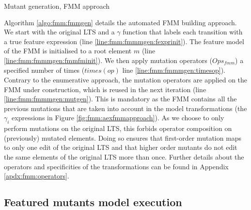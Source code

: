 \begin{algorithm}
	\caption{Mutant generation, FMM approach}
 \label{algo:fmm:fmmgen}
\end{algorithm}

Algorithm \ref{algo:fmm:fmmgen} details the automated FMM building approach. We start with the original LTS and a $\gamma$ function that labels each transition with a true feature expression (line \ref{line:fmm:fmmmgen:fexprinit}). The feature model of the FMM is initialised to a root element $m$ (line \ref{line:fmm:fmmmgen:fmmfminit}). We then apply mutation operators ($\mathit{Ops_{fmm}}$) a specified number of times ($\mathit{times}(\mathit{op})$ line \ref{line:fmm:fmmmgen:timesop}). Contrary to the enumerative approach, the mutation operators are applied on the FMM under construction, which is reused in the next iteration (line \ref{line:fmm:fmmmgen:mutgen}). This is mandatory as the FMM contains all the previous mutations that are taken into account in the model transformations (\eg the $\gamma_{i}$ expressions in Figure \ref{fig:fmm:aexfmmapproach}). 
As we choose to only perform mutations on the original LTS, this forbids operator composition on (previously) mutated elements. Doing so ensures that first-order mutation maps to only one edit of the original LTS and that higher order mutants do not edit the same elements of the original LTS more than once.
Further details about the operators and specificities of the transformations can be found in Appendix \ref{apdx:fmm:operators}.

\subsection{Featured mutants model execution}

